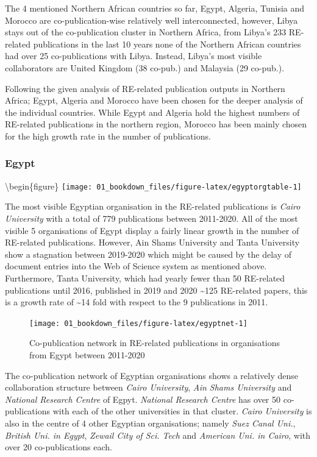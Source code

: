 \documentclass[
]{book}
\begin{document}
The 4 mentioned Northern African countries so far, Egypt, Algeria, Tunisia and Morocco are co-publication-wise relatively well interconnected, however, Libya stays out of the co-publication cluster in Northern Africa, from Libya's 233 RE-related publications in the last 10 years none of the Northern African countries had over 25 co-publications with Libya. Instead, Libya's most visible collaborators are United Kingdom (38 co-pub.) and Malaysia (29 co-pub.).

Following the given analysis of RE-related publication outputs in Northern Africa;
Egypt, Algeria and Morocco have been chosen for the deeper analysis of the individual countries.
While Egypt and Algeria hold the highest numbers of RE-related publications in the northern
region, Morocco has been mainly chosen for the high growth rate in the number of publications.

\hypertarget{egypt}{%
\subsubsection{Egypt}\label{egypt}}

\textbackslash begin\{figure\}
\texttt{[image: 01\_bookdown\_files/figure-latex/egyptorgtable-1]}

The most visible Egyptian organisation in the RE-related publications is \emph{Cairo University} with a total of 779 publications between 2011-2020. All of the most visible 5 organisations of Egypt display a fairly linear growth in the number of RE-related publications. However, Ain Shams University and Tanta University show a stagnation between 2019-2020 which might be caused by the delay of document entries into the Web of Science system as mentioned above. Furthermore, Tanta University, which had yearly fewer than 50 RE-related publications until 2016, published in 2019 and 2020 \textasciitilde125 RE-related papers, this is a growth rate of \textasciitilde14 fold with respect to the 9 publications in 2011.

\begin{figure}
\texttt{[image: 01\_bookdown\_files/figure-latex/egyptnet-1]} \caption{Co-publication network in RE-related publications in organisations from Egypt between 2011-2020}\label{fig:egyptnet}
\end{figure}

The co-publication network of Egyptian organisations shows a relatively dense collaboration structure between \emph{Cairo University}, \emph{Ain Shams University} and \emph{National Research Centre} of Egpyt. \emph{National Research Centre} has over 50 co-publications with each of the other universities in that cluster. \emph{Cairo University} is also in the centre of 4 other Egyptian organisations; namely \emph{Suez Canal Uni.}, \emph{British Uni. in Egypt}, \emph{Zewail City of Sci. Tech} and \emph{American Uni. in Cairo}, with over 20 co-publications each.
\end{document}
